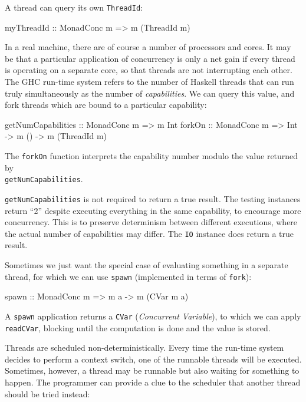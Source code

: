 A thread can query its own \verb|ThreadId|:

\begin{haskellcode}
myThreadId :: MonadConc m => m (ThreadId m)
\end{haskellcode}

In a real machine, there are of course a number of processors and
cores. It may be that a particular application of concurrency is only
a net gain if every thread is operating on a separate core, so that
threads are not interrupting each other. The GHC run-time system
refers to the number of Haskell threads that can run truly
simultaneously as the number of \emph{capabilities}. We can query this
value, and fork threads which are bound to a particular capability:

\begin{haskellcode}
getNumCapabilities :: MonadConc m => m Int
forkOn :: MonadConc m => Int -> m () -> m (ThreadId m)
\end{haskellcode}

The \verb|forkOn| function interprets the capability number modulo the
value returned by \\\verb|getNumCapabilities|.

\begin{departure}
  \verb|getNumCapabilities| is not required to return a true
  result. The testing instances return ``2'' despite executing
  everything in the same capability, to encourage more
  concurrency. This is to preserve determinism between different
  executions, where the actual number of capabilities may differ. The
  \verb|IO| instance does return a true result.
\end{departure}

Sometimes we just want the special case of evaluating something in a
separate thread, for which we can use \verb|spawn| (implemented in
terms of \verb|fork|):

\begin{haskellcode}
spawn :: MonadConc m => m a -> m (CVar m a)
\end{haskellcode}

A \verb|spawn| application returns a \verb|CVar| (\emph{Concurrent
  Variable}), to which we can apply \verb|readCVar|, blocking until
the computation is done and the value is stored.

Threads are scheduled non-deterministically. Every time the run-time
system decides to perform a context switch, one of the runnable
threads will be executed. Sometimes, however, a thread may be runnable
but also waiting for something to happen. The programmer can provide a
clue to the scheduler that another thread should be tried instead:

